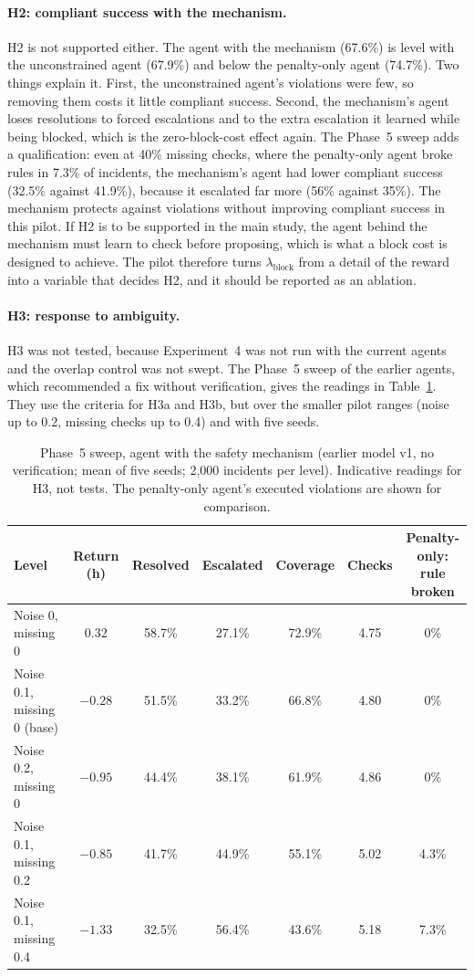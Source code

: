 \documentclass[11pt,a4paper]{article}
\begin{document}
\paragraph{H2: compliant success with the mechanism.} H2 is not supported either. The agent with the mechanism (67.6\%) is level with the unconstrained agent (67.9\%) and below the penalty-only agent (74.7\%). Two things explain it. First, the unconstrained agent's violations were few, so removing them costs it little compliant success. Second, the mechanism's agent loses resolutions to forced escalations and to the extra escalation it learned while being blocked, which is the zero-block-cost effect again. The Phase~5 sweep adds a qualification: even at 40\% missing checks, where the penalty-only agent broke rules in 7.3\% of incidents, the mechanism's agent had lower compliant success (32.5\% against 41.9\%), because it escalated far more (56\% against 35\%). The mechanism protects against violations without improving compliant success in this pilot. If H2 is to be supported in the main study, the agent behind the mechanism must learn to check before proposing, which is what a block cost is designed to achieve. The pilot therefore turns $\lambda_{\text{block}}$ from a detail of the reward into a variable that decides H2, and it should be reported as an ablation.

\paragraph{H3: response to ambiguity.} H3 was not tested, because Experiment~4 was not run with the current agents and the overlap control was not swept. The Phase~5 sweep of the earlier agents, which recommended a fix without verification, gives the readings in Table~\ref{tab:sweep}. They use the criteria for H3a and H3b, but over the smaller pilot ranges (noise up to 0.2, missing checks up to 0.4) and with five seeds.

\begin{table}[H]
\centering\small
\caption{Phase~5 sweep, agent with the safety mechanism (earlier model v1, no verification; mean of five seeds; 2,000 incidents per level). Indicative readings for H3, not tests. The penalty-only agent's executed violations are shown for comparison.}
\label{tab:sweep}
\begin{tabular}{@{}lcccccc@{}}
\toprule
Level & Return (h) & Resolved & Escalated & Coverage & Checks & \shortstack{Penalty-only:\\rule broken} \\
\midrule
Noise 0, missing 0 & $0.32$ & 58.7\% & 27.1\% & 72.9\% & 4.75 & 0\% \\
Noise 0.1, missing 0 (base) & $-0.28$ & 51.5\% & 33.2\% & 66.8\% & 4.80 & 0\% \\
Noise 0.2, missing 0 & $-0.95$ & 44.4\% & 38.1\% & 61.9\% & 4.86 & 0\% \\
Noise 0.1, missing 0.2 & $-0.85$ & 41.7\% & 44.9\% & 55.1\% & 5.02 & 4.3\% \\
Noise 0.1, missing 0.4 & $-1.33$ & 32.5\% & 56.4\% & 43.6\% & 5.18 & 7.3\% \\
\bottomrule
\end{tabular}
\end{table}
\end{document}

